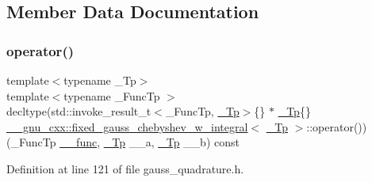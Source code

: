 \subsection{Member Data Documentation}
\mbox{\label{struct____gnu__cxx_1_1fixed__gauss__chebyshev__w__integral_a4edc668031c2cf7ac499d4096d675f33}} 
\subsubsection{\texorpdfstring{operator()}{operator()}}
{\footnotesize\ttfamily template$<$typename \+\_\+\+Tp$>$ \\
template$<$typename \+\_\+\+Func\+Tp $>$ \\
decltype(std\+::invoke\+\_\+result\+\_\+t$<$\+\_\+\+Func\+Tp, \hyperlink{namespace____gnu__cxx_a3b19a9c800ca194374ef9172290f7d79}{\+\_\+\+Tp}$>$\{\} $\ast$ \hyperlink{namespace____gnu__cxx_a3b19a9c800ca194374ef9172290f7d79}{\+\_\+\+Tp}\{\} \hyperlink{struct____gnu__cxx_1_1fixed__gauss__chebyshev__w__integral}{\+\_\+\+\_\+gnu\+\_\+cxx\+::fixed\+\_\+gauss\+\_\+chebyshev\+\_\+w\+\_\+integral}$<$ \hyperlink{namespace____gnu__cxx_a3b19a9c800ca194374ef9172290f7d79}{\+\_\+\+Tp} $>$\+::operator()) (\+\_\+\+Func\+Tp \hyperlink{namespace____gnu__cxx_af2b2f0c7a2ae72b922b1afefae5a65b2}{\+\_\+\+\_\+func}, \hyperlink{namespace____gnu__cxx_a3b19a9c800ca194374ef9172290f7d79}{\+\_\+\+Tp} \+\_\+\+\_\+a, \hyperlink{namespace____gnu__cxx_a3b19a9c800ca194374ef9172290f7d79}{\+\_\+\+Tp} \+\_\+\+\_\+b) const}



Definition at line 121 of file gauss\+\_\+quadrature.\+h.

\mbox{\label{struct____gnu__cxx_1_1fixed__gauss__chebyshev__w__integral_a5e530e42d3634af232d18ad5d95914c9}} 

